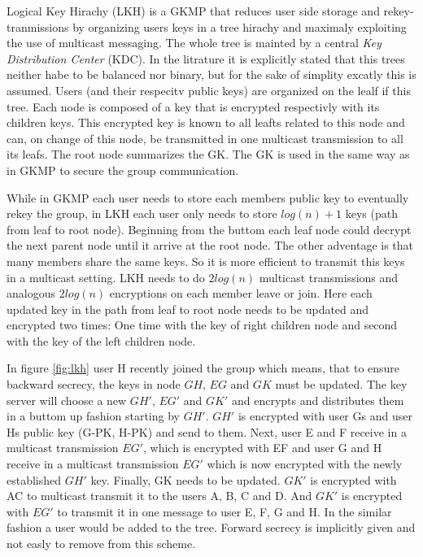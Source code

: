 Logical Key Hirachy (LKH)\cite{wallner1999key} is a GKMP that reduces user side storage and rekey-tranmissions by organizing users keys in a tree hirachy and maximaly exploiting the use of multicast messaging. The whole tree is mainted by a central \textit{Key Distribution Center} (KDC). In the litrature it is explicitly stated that this trees neither habe to be balanced nor binary, but for the sake of simplity excatly this is assumed. Users (and their respecitv public keys) are organized on the lealf if this tree. Each node is composed of a key that is encrypted respectivly with its children keys. This encrypted key is known to all leafts related to this node and can, on change of this node, be transmitted in one multicast transmission to all its leafs. The root node summarizes the GK. The GK is used in the same way as in GKMP to secure the group communication. 

While in GKMP each user needs to store each members public key to eventually rekey the group, in LKH each user only needs to store $log(n) +1$ keys (path from leaf to root node). Beginning from the buttom each leaf node could decrypt the next parent node until it arrive at the root node. The other adventage is that many members share the same keys. So it is more efficient to transmit this keys in a multicast setting. LKH needs to do $2log(n)$ multicast transmissions and analogous $2log(n)$ encryptions on each member leave or join.  Here each updated key in the path from leaf to root node needs to be updated and encrypted two times: One time with the key of right children node and second with the key of the left children node. 

In figure \ref{fig:lkh} user H recently joined the group which means, that to ensure backward secrecy, the keys in node $GH$, $EG$ and $GK$ must be updated. The key server will choose a new $GH'$, $EG'$ and $GK'$ and encrypts and distributes them in a buttom up fashion starting by $GH'$. $GH'$ is encrypted with user Gs and user Hs public key (G-PK, H-PK) and send to them. Next, user E and F receive in a multicast transmission $EG'$, which is encrypted with EF and user G and H receive in a multicast transmission $EG'$ which is now encrypted with the newly established $GH'$ key. Finally, GK needs to be updated. $GK'$ is encrypted with AC to multicast transmit it to the users A, B, C and D. And $GK'$ is encrypted with $EG'$ to transmit it in one message to user E, F, G and H. In the similar fashion a user would be added to the tree. Forward secrecy is implicitly given and not easly to remove from this scheme.

